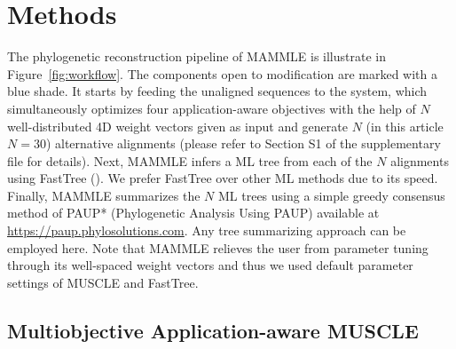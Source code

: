 \section{Methods}
The phylogenetic reconstruction pipeline of MAMMLE is illustrate in Figure~\ref{fig:workflow}. The components open to modification are marked with a blue shade. It starts by feeding the unaligned sequences to the system, which simultaneously optimizes four application-aware objectives with the help of $N$ well-distributed 4D weight vectors given as input and generate $N$ (in this article $N=30$) alternative alignments (please refer to Section S1 of the supplementary file for details). %
Next, MAMMLE infers a ML tree from each of the $N$ alignments using FastTree (\cite{price2010fasttree}). We prefer FastTree over other ML methods due to its speed. Finally, MAMMLE summarizes the $N$ ML trees using a simple greedy consensus method of PAUP* (Phylogenetic Analysis Using PAUP) available at \url{https://paup.phylosolutions.com}. Any tree summarizing approach can be employed here. Note that MAMMLE relieves the user from parameter tuning through its well-spaced weight vectors and thus we used default parameter settings of MUSCLE and FastTree. 



\subsection{Multiobjective Application-aware MUSCLE} \label{sec:ma-muscle}

